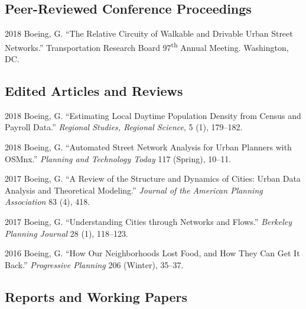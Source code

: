 \documentclass[12pt,letterpaper]{report}
\begin{document}
\subsection*{Peer-Reviewed Conference Proceedings}

\begin{tablist}
	
	\item[2018] \tab Boeing, G. \enquote{The Relative Circuity of Walkable and Drivable Urban Street Networks.} Transportation Research Board 97\textsuperscript{th} Annual Meeting. Washington, DC.
	
\end{tablist}



\subsection*{Edited Articles and Reviews}

\begin{tablist}
	
\item[2018] \tab Boeing, G. \enquote{Estimating Local Daytime Population Density from Census and Payroll Data.} \textit{Regional Studies, Regional Science}, 5 (1), 179--182.

\item[2018] \tab Boeing, G. \enquote{Automated Street Network Analysis for Urban Planners with OSMnx.} \textit{Planning and Technology Today} 117 (Spring), 10--11.
	
\item[2017] \tab Boeing, G. \enquote{A Review of the Structure and Dynamics of Cities: Urban Data Analysis and Theoretical Modeling.} \textit{Journal of the American Planning Association} 83 (4), 418.
	
\item[2017] \tab Boeing, G. \enquote{Understanding Cities through Networks and Flows.} \textit{Berkeley Planning Journal} 28 (1), 118--123.

\item[2016] \tab Boeing, G. \enquote{How Our Neighborhoods Lost Food, and How They Can Get It Back.} \textit{Progressive Planning} 206 (Winter), 35--37.
	
\end{tablist}



\subsection*{Reports and Working Papers}
\end{document}
